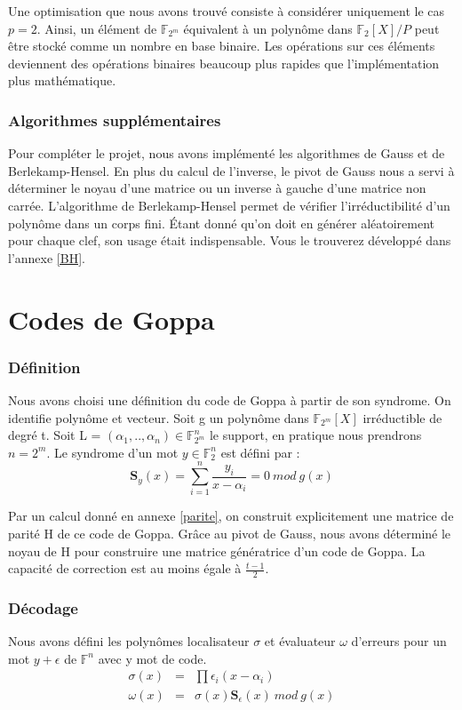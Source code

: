 \documentclass{article}
\begin{document}
			Une optimisation que nous avons trouvé consiste à considérer uniquement le cas $p = 2$.
			Ainsi, un élément de $\mathbb{F}_{2^{m}}$ équivalent à un polynôme dans $\mathbb{F}_{2}[X]/P$ peut être stocké comme un nombre en base binaire.
			Les opérations sur ces éléments deviennent des opérations binaires beaucoup plus rapides que l'implémentation plus mathématique.

		\section*{Algorithmes supplémentaires}
			Pour compléter le projet, nous avons implémenté les algorithmes de Gauss et de Berlekamp-Hensel.
			En plus du calcul de l'inverse, le pivot de Gauss nous a servi à déterminer le noyau d'une matrice ou un inverse à gauche d'une matrice non carrée.
			L'algorithme de Berlekamp-Hensel \cite{berlekamp} permet de vérifier l'irréductibilité d'un polynôme dans un corps fini.
			Étant donné qu'on doit en générer aléatoirement pour chaque clef, son usage était indispensable.
			Vous le trouverez développé dans l'annexe \ref{BH}.

	\part*{Codes de Goppa}

		\section*{Définition}
			\cite{finiasz}
			Nous avons choisi une définition du code de Goppa à partir de son syndrome.
			On identifie polynôme et vecteur.
			Soit g un polynôme dans $\mathbb{F}_{2^{m}}[X]$ irréductible de degré t.
			Soit L = $ (\alpha_{1},..,\alpha_{n})  \in \mathbb{F}_{2^{m}}^{n}$ le support, en pratique nous prendrons $n = 2^{m}$.
			Le syndrome d'un mot $y \in \mathbb{F}_{2}^{n}$ est défini par :
			$$
				\mathbf{S}_{y}(x) = \sum_{i=1}^{n} \frac{y_{i}}{x-\alpha_{i}} = 0 \ mod \ g(x)
			$$

			Par un calcul donné en annexe \ref{parite}, on construit explicitement une matrice de parité H de ce code de Goppa.
			Grâce au pivot de Gauss, nous avons déterminé le noyau de H pour construire une matrice génératrice d'un code de Goppa.
			La capacité de correction est au moins égale à $\frac{t-1}{2}$.


		\section*{Décodage}
			Nous avons défini les polynômes localisateur $\sigma$ et évaluateur $\omega$ d'erreurs pour un mot $y + \epsilon$ de $\mathbb{F}^{n}$ avec y mot de code.
			\begin{eqnarray}
				\sigma(x) &=& \prod \epsilon_{i}(x - \alpha_{i}) \\
				\omega(x) &=& \sigma(x) \mathbf{S}_{\epsilon}(x) \ mod \ g(x)
			\end{eqnarray}
\end{document}

